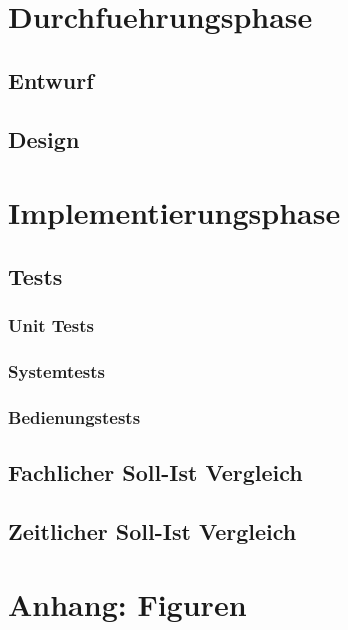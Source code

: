 \documentclass[11pt, a4paper]{article}
\begin{document}
  \section{Durchfuehrungsphase}
    \subsection{Entwurf}
    \subsection{Design}
    \newpage

  \section{Implementierungsphase}
    \subsection{Tests}
      \subsubsection{Unit Tests}
      \subsubsection{Systemtests}
      \subsubsection{Bedienungstests}
    \subsection{Fachlicher Soll-Ist Vergleich}
    \subsection{Zeitlicher Soll-Ist Vergleich}
    \newpage

  \begin{appendix}
    \listoffigures
    \listoftables
  \end{appendix}
  \newpage

  \section{Anhang: Figuren}
\end{document}
